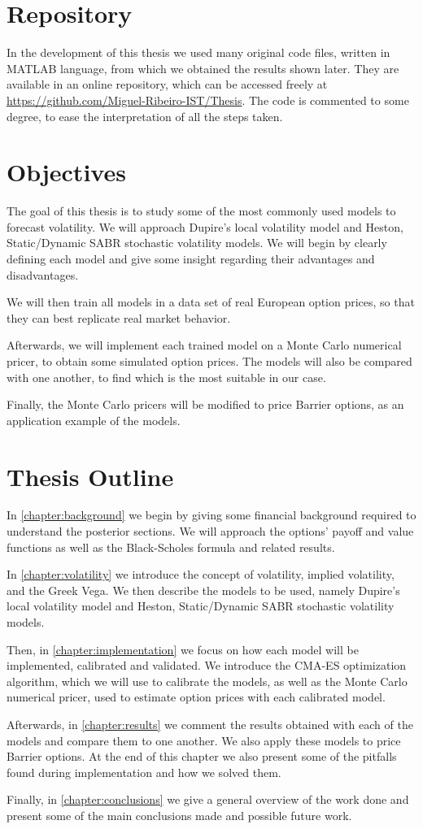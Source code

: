 \section{Repository}
In the development of this thesis we used many original code files, written in MATLAB language, from which we obtained the results shown later. They are available in an online repository, which can be accessed freely at \url{https://github.com/Miguel-Ribeiro-IST/Thesis}.
The code is commented to some degree, to ease the interpretation of all the steps taken.

\vfill
\newpage

\section{Objectives}
The goal of this thesis is to study some of the most commonly used models to forecast volatility. We will approach Dupire's local volatility model and Heston, Static/Dynamic SABR stochastic volatility models. We will begin by clearly defining each model and give some insight regarding their advantages and disadvantages.

We will then train all models in a data set of real European option prices, so that they can best replicate real market behavior.

Afterwards, we will implement each trained model on a Monte Carlo numerical pricer, to obtain some simulated option prices. The models will also be compared with one another, to find which is the most suitable in our case.

Finally, the Monte Carlo pricers will be modified to price Barrier options, as an application example of the models.

\section{Thesis Outline}
In \autoref{chapter:background} we begin by giving some financial background required to understand the posterior sections. We will approach the options' payoff and value functions as well as the Black-Scholes formula and related results.

In \autoref{chapter:volatility} we introduce the concept of volatility, implied volatility, and the Greek Vega. We then describe the models to be used, namely Dupire's local volatility model and Heston, Static/Dynamic SABR stochastic volatility models.

Then, in \autoref{chapter:implementation} we focus on how each model will be implemented, calibrated and validated. We introduce the CMA-ES optimization algorithm, which we will use to calibrate the models, as well as the Monte Carlo numerical pricer, used to estimate option prices with each calibrated model.

Afterwards, in \autoref{chapter:results} we comment the results obtained with each of the models and compare them to one another. We also apply these models to price Barrier options. At the end of this chapter we also present some of the pitfalls found during implementation and how we solved them.

Finally, in \autoref{chapter:conclusions} we give a general overview of the work done and present some of the main conclusions made and possible future work.